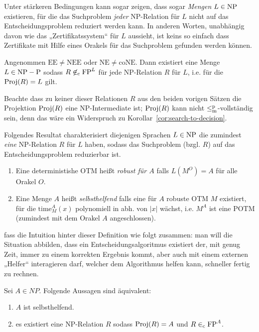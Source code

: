 Unter stärkeren Bedingungen kann sogar zeigen, dass sogar \emph{Mengen} $L\in\mathrm{NP}$ existieren, für die das Suchproblem \emph{jeder} NP-Relation für $L$ nicht auf das Entscheidungsproblem reduziert werden kann. In anderen Worten, unabhängig davon wie das „Zertifikatssystem“ für $L$ aussieht, ist keins so einfach dass Zertifikate mit Hilfe eines Orakels für das Suchproblem gefunden werden können.

\begin{theorem}
Angenommen $\mathrm{EE\neq NEE}$ oder $\mathrm{NE\neq coNE}$. Dann existiert eine Menge $L\in\mathrm{NP}-\mathrm{P}$ sodass $R\not\in_\mathrm{c} \mathrm{FP}^L$ für jede NP-Relation $R$ für $L$, i.e. für die $\operatorname{Proj}(R)=L$ gilt.
\end{theorem}
Beachte dass zu keiner dieser Relationen $R$ aus den beiden vorigen Sätzen die Projektion $\operatorname{Proj}(R)$ eine NP-Intermediate ist; $\operatorname{Proj}(R)$ kann nicht $\leq_\mathrm{m}^\mathrm{p}$-vollständig sein, denn das wäre ein Widerspruch zu Korollar~\ref{cor:search-to-decision}.

Folgendes Resultat charakterisiert diejenigen Sprachen $L\in\mathrm{NP}$ die zumindest \emph{eine} NP-Relation $R$ für $L$ haben, sodass das Suchproblem (bzgl. $R$) auf das Entscheidungsproblem reduzierbar ist.
\begin{definition}
    \begin{enumerate}
        \item Eine deterministishe OTM heißt \emph{robust für $A$} falls $L(M^O)=A$ für alle Orakel $O$.
        \item Eine Menge $A$ heißt \emph{selbsthelfend} falls eine für $A$ robuste OTM $M$ existiert, für die $\mathrm{time}_M^A(x)$ polynomiell in abh. von $|x|$ wächst, i.e. $M^A$ ist eine POTM (zumindest mit dem Orakel $A$ angeschlossen).\qedhere
    \end{enumerate}
\end{definition}
\citeauthor{balcazar_self_1989} fass die Intuition hinter dieser Definition wie folgt zusammen: man will die Situation abbilden, dass ein Entscheidungsalgoritmus existiert der, mit genug Zeit, immer zu einem korrekten Ergebnis kommt, aber auch mit einem externen „Helfer“ interagieren darf, welcher dem Algorithmus helfen kann, schneller fertig zu rechnen.
\begin{theorem}
    Sei $A\in NP$. Folgende Aussagen sind äquivalent:
    \begin{enumerate}
        \item $A$ ist selbsthelfend.
        \item es existiert eine NP-Relation $R$ sodass $\operatorname{Proj}(R)=A$ und $R\in_\mathrm{c} \mathrm{FP}^{A}$.
    \end{enumerate}
\end{theorem}

